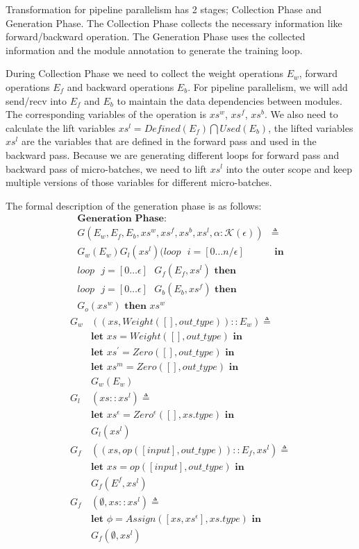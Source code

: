\documentclass[sigplan]{acmart}\settopmatter{printfolios=true,printccs=false,printacmref=false}
\begin{document}
Transformation for pipeline parallelism has 2 stages; Collection Phase and Generation Phase. The Collection Phase collects the necessary information like forward/backward operation. The Generation Phase uses the collected information and the module annotation to generate the training loop.\par
During Collection Phase we need to collect the weight operations $E_w$, forward operations $E_f$ and backward operations $E_b$. For pipeline parallelism, we will add send/recv into $E_f$ and $E_b$ to maintain the data dependencies between modules. The corresponding variables of the operation is $xs^w$, $xs^f$, $xs^b$. We also need to calculate the lift variables $xs^l = Defined(E_f) \bigcap Used(E_b)$, the lifted variables $xs^l$ are the variables that are defined in the forward pass and used in the backward pass. Because we are generating different loops for forward pass and backward pass of micro-batches, we need to lift $xs^l$ into the outer scope and keep multiple versions of those variables for different micro-batches.\par
The formal description of the generation phase is as follows:
\begin{align*}
  \textbf{Generation Phase}: \qquad \qquad& \\
  G(E_w,E_f,E_b, xs^w,xs^f,xs^b,xs^l,\alpha:\mathcal{K} (\epsilon))& \triangleq \\
  G_w(E_w)G_l(xs^l)(loop \text{  } i=[0\dots n/\epsilon] &\textbf{ in}\\
  loop \text{  }j=[0\dots \epsilon]\text{ }G_f(E_f, xs^l) \textbf{ then}&\\
  loop \text{  }j=[0\dots \epsilon]\text{ }G_b(E_b, xs^f) \textbf{ then}&\\
  G_o(xs^w) \textbf{ then } xs^w\quad \qquad \qquad&
\end{align*}
\begin{align*}
  G_w&((xs, Weight([], out\_type))::E_w)\triangleq\\
  &\textbf{let } xs=Weight([], out\_type) \textbf{ in}\\
  &\textbf{let } xs^\prime=Zero([], out\_type) \textbf{ in}\\
  &\textbf{let } xs^m=Zero([], out\_type) \textbf{ in}\\
  &G_w(E_w)\\
  G_l&(xs::xs^l)\triangleq\\
  &\textbf{let } xs^\epsilon=Zero^\epsilon([], xs.type) \textbf{ in}\\
  &G_l(xs^l)\\
  G_f&((xs, op([input], out\_type))::E_f, xs^l)\triangleq\\
  &\textbf{let } xs=op([input], out\_type) \textbf{ in}\\
  &G_f(E^f, xs^l)\\
  G_f&(\emptyset, xs::xs^l)\triangleq\\
  &\textbf{let } \phi=Assign([xs, xs^\epsilon], xs.type) \textbf{ in}\\
  &G_f(\emptyset, xs^l)
\end{align*}
\end{document}
